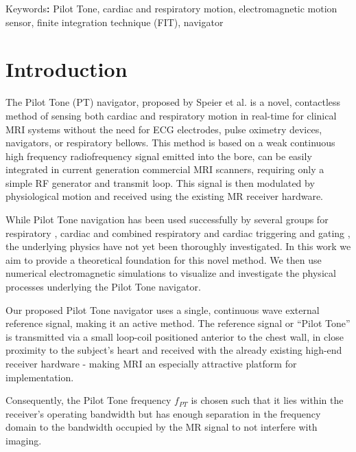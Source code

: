 \documentclass[
]{article}
\begin{document}
Keywords\textbf{:} Pilot Tone, cardiac and respiratory motion,
electromagnetic motion sensor, finite integration technique (FIT), navigator

\section{Introduction}\label{introduction}

The Pilot Tone (PT) navigator, proposed by Speier et al. \cite{Speier2015PT-Nav:MR-receiver} is a
novel, contactless method of sensing both cardiac and respiratory motion
in real-time for clinical MRI systems without the need for ECG
electrodes, pulse oximetry devices, navigators, or respiratory bellows.
This method is based on a weak continuous high frequency radiofrequency
signal \cite{NationalCommunicationsSystemTechnologyStandardsDivision1996} emitted into the bore, can be easily integrated in
current generation commercial MRI scanners, requiring only a simple RF
generator and transmit loop. This signal is then modulated by
physiological motion and received using the existing MR receiver
hardware.

While Pilot Tone navigation has been used successfully by several groups
for respiratory \cite{Vahle2020RespiratoryTone, Rigie2018TrackingNavigation, Koesters2016MotionNavigators, Lenk2018RespiratoryTechnology, Schroeder2016a, Anand2021BeatNavigators}, cardiac \cite{Bacher2017PilotInitialization, Bacher2018PilotCine, Bacher2017RetrospectiveCohort, Bacher2017CardiacStudy, Bacher2020PerformanceFramework, Schroeder2016} and combined respiratory
and cardiac triggering and gating \cite{Falcao20195DGating, Bacher2020RetrospectiveCohort}, the underlying physics
have not yet been thoroughly investigated. In this work we aim to
provide a theoretical foundation for this novel method. We then use
numerical electromagnetic simulations to visualize and investigate the
physical processes underlying the Pilot Tone navigator.

Our proposed Pilot Tone navigator uses a single, continuous
wave external reference signal, making it an active method. The
reference signal or ``Pilot Tone'' is transmitted via a small loop-coil
positioned anterior to the chest wall, in close proximity to the
subject's heart and received with the already existing high-end receiver hardware - making MRI an especially attractive platform for implementation.

Consequently, the Pilot Tone frequency $f_{PT}$ is chosen such that it
lies within the receiver's operating bandwidth but has enough separation
in the frequency domain to the bandwidth occupied by the MR signal to
not interfere with imaging.
\end{document}
